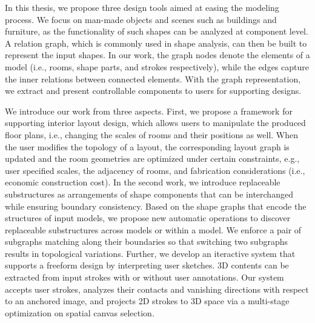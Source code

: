 In this thesis, we propose three design tools aimed at easing the modeling process. We focus on man-made objects and scenes such as buildings and furniture, as the functionality of such shapes can be analyzed at component level. A relation graph, which is commonly used in shape analysis, can then be built to represent the input shapes. In our work, the graph nodes denote the elements of a model (i.e., rooms, shape parts, and strokes respectively), while the edges capture the inner relations between connected elements. With the graph representation, we extract and present controllable components to users for supporting designs.


We introduce our work from three aspects. First, we propose a framework for supporting interior layout design, which allows users to manipulate the produced floor plans, i.e., changing the scales of rooms and their positions as well. When the user modifies the topology of a layout, the corresponding layout graph is updated and the room geometries are optimized under certain constraints, e.g., user specified scales, the adjacency of rooms, and fabrication considerations (i.e., economic construction cost). In the second work, we introduce replaceable substructures as arrangements of shape components that can be interchanged while ensuring boundary consistency. Based on the shape graphs that encode the structures of input models, we propose new automatic operations to discover replaceable substructures across models or within a model. We enforce a pair of subgraphs matching along their boundaries so that switching two subgraphs results in topological variations. Further, we develop an iteractive system that supports a freeform design by interpreting user sketches. 3D contents can be extracted from input strokes with or without user annotations. Our system accepts user strokes, analyzes their contacts and vanishing directions with respect to an anchored image, and projects 2D strokes to 3D space via a multi-stage optimization on spatial canvas selection.











